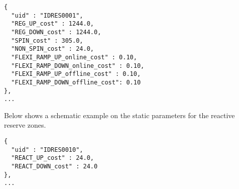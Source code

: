\begin{verbatim}
{
  "uid" : "IDRES0001",
  "REG_UP_cost" : 1244.0,
  "REG_DOWN_cost" : 1244.0,
  "SPIN_cost" : 305.0,
  "NON_SPIN_cost" : 24.0,  
  "FLEXI_RAMP_UP_online_cost" : 0.10,  
  "FLEXI_RAMP_DOWN_online_cost" : 0.10,
  "FLEXI_RAMP_UP_offline_cost" : 0.10,
  "FLEXI_RAMP_DOWN_offline_cost": 0.10 
},
...
\end{verbatim}


Below shows a schematic example on the static parameters for the reactive reserve zones. 
\begin{verbatim}
{
  "uid" : "IDRES0010",
  "REACT_UP_cost" : 24.0,
  "REACT_DOWN_cost" : 24.0
},
...
\end{verbatim}




\endinput 









\subsection{Substation}
\label{sec:substation}
A \emph{substation} is a collection of equipment located at a the same physical site and belonging to one Transmission System Operator (TSO). 
It is usually composed of different voltage levels with transformers.
Substation objects are required to have: 
\begin{itemize}
    \item A \texttt{"uid"} object\\
    The value of the object must be a unique ID (string) identifying the component.    
    \item A \texttt{"buses"} object\\
    The value of the object is an array identifying the unique IDs of the buses located within the substation.    
\end{itemize}
Network example:
\begin{verbatim}
{
  "uid" : "IDSUB0001",
  "buses" : ["IDB0001", "IDB0002", "IDB0010"],
},
…    
\end{verbatim}


